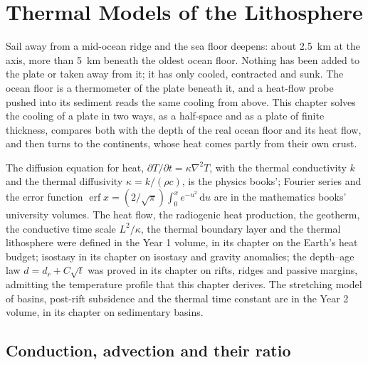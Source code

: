 \chapter{Thermal Models of the Lithosphere}\label{ch:b3:lithosphere-thermal-models}

Sail away from a mid-ocean ridge and the sea floor deepens: about
\qty{2.5}{km} at the axis, more than \qty{5}{km} beneath the oldest ocean
floor. Nothing has been added to the plate or taken away from it; it has only
cooled, contracted and sunk. The ocean floor is a thermometer of the plate
beneath it, and a heat-flow probe pushed into its sediment reads the same
cooling from above. This chapter solves the cooling of a plate in two ways, as
a half-space and as a plate of finite thickness, compares both with the depth
of the real ocean floor and its heat flow, and then turns to the continents,
whose heat comes partly from their own crust.

\begin{recall}
The diffusion equation for heat, $\partial T/\partial t = \kappa\nabla^2T$,
with the thermal conductivity $k$ and the thermal diffusivity $\kappa =
k/(\rho c)$, is the physics books'; Fourier series and the error function
$\operatorname{erf}x = (2/\sqrt\pi)\int_0^xe^{-u^2}\,\mathrm du$ are in the
mathematics books' university volumes. The heat flow, the radiogenic heat
production, the geotherm, the conductive time scale $L^2/\kappa$, the thermal
boundary layer and the thermal lithosphere were defined in the Year 1 volume,
in its chapter on the Earth's heat budget; isostasy in its chapter on isostasy
and gravity anomalies; the depth--age law $d = d_r + C\sqrt t$ was proved in
its chapter on rifts, ridges and passive margins, admitting the temperature
profile that this chapter derives. The stretching model of basins, post-rift
subsidence and the thermal time constant are in the Year 2 volume, in its
chapter on sedimentary basins.
\end{recall}

\section{Conduction, advection and their ratio}


